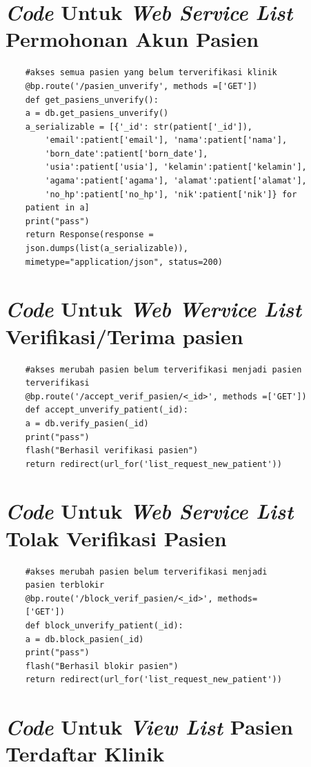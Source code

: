 \chapter{\emph{Code} Untuk \emph{Web Service} \emph{List} Permohonan Akun Pasien}

\begin{lstlisting}
	#akses semua pasien yang belum terverifikasi klinik
	@bp.route('/pasien_unverify', methods =['GET'])
	def get_pasiens_unverify():
	a = db.get_pasiens_unverify()
	a_serializable = [{'_id': str(patient['_id']),
		'email':patient['email'], 'nama':patient['nama'],
		'born_date':patient['born_date'],
		'usia':patient['usia'], 'kelamin':patient['kelamin'],
		'agama':patient['agama'], 'alamat':patient['alamat'],
		'no_hp':patient['no_hp'], 'nik':patient['nik']} for
	patient in a]
	print("pass")
	return Response(response =
	json.dumps(list(a_serializable)),
	mimetype="application/json", status=200)
\end{lstlisting}

\chapter{\emph{Code} Untuk \emph{Web Wervice List} Verifikasi/Terima pasien}

\begin{lstlisting}
	#akses merubah pasien belum terverifikasi menjadi pasien
	terverifikasi
	@bp.route('/accept_verif_pasien/<_id>', methods =['GET'])
	def accept_unverify_patient(_id):
	a = db.verify_pasien(_id)
	print("pass")
	flash("Berhasil verifikasi pasien")
	return redirect(url_for('list_request_new_patient'))
\end{lstlisting}

\chapter{\emph{Code} Untuk \emph{Web Service List} Tolak Verifikasi Pasien}

\begin{lstlisting}
	#akses merubah pasien belum terverifikasi menjadi 
	pasien terblokir
	@bp.route('/block_verif_pasien/<_id>', methods=
	['GET'])
	def block_unverify_patient(_id):
	a = db.block_pasien(_id)
	print("pass")
	flash("Berhasil blokir pasien")
	return redirect(url_for('list_request_new_patient'))
\end{lstlisting}

\chapter{\emph{Code} Untuk \emph{View List} Pasien Terdaftar Klinik}


